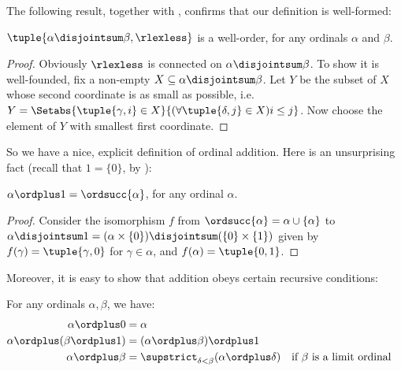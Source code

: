 \documentclass[../../../include/open-logic-section]{subfiles}
\begin{document}
The following result, together with
, confirms that our
definition is well-formed:

\begin{lem} 
$\tuple{\alpha \disjointsum \beta, \rlexless}$ is a well-order, for
any ordinals $\alpha$ and $\beta$.
\end{lem}

\begin{proof}
Obviously $\rlexless$ is connected on $\alpha \disjointsum \beta$. To
show it is well-founded, fix a non-empty $X \subseteq \alpha
\disjointsum \beta$. Let $Y$ be the subset of $X$ whose second coordinate is as small as possible, i.e.\ $Y = \Setabs{\tuple{\gamma, i} \in X}{(\forall \tuple{\delta, j} \in X)i \leq j}$. Now choose the element of $Y$ with smallest first coordinate. 
\end{proof}
\noindent 
So we have a nice, explicit definition of ordinal addition. Here is
an unsurprising fact (recall that  $1 = \{0\}$, by
):
\begin{prop}
$\alpha \ordplus  1 = \ordsucc{\alpha}$, for any ordinal $\alpha$.
\end{prop}

\begin{proof}
Consider the isomorphism $f$ from $\ordsucc{\alpha} = \alpha \cup
\{\alpha\}$ to $\alpha\disjointsum1 = (\alpha \times \{0\})
\disjointsum (\{0\} \times \{1\})$ given by $f(\gamma) =
\tuple{\gamma, 0}$ for $\gamma \in \alpha$, and $f(\alpha) = \tuple{0,
1}$.
\end{proof}
\noindent
Moreover, it is easy to show that addition obeys certain recursive
conditions:

\begin{lem}
For any ordinals $\alpha, \beta$, we have:
\begin{align*}
	\alpha\ordplus 0 &= \alpha\\
	\alpha \ordplus  (\beta\ordplus 1) &= (\alpha \ordplus  \beta) \ordplus  1\\
	\alpha  \ordplus  \beta &= \supstrict_{\delta < \beta}(\alpha \ordplus  \delta) && \text{if $\beta $ is a limit ordinal}
\end{align*}
\end{lem}
\end{document}
